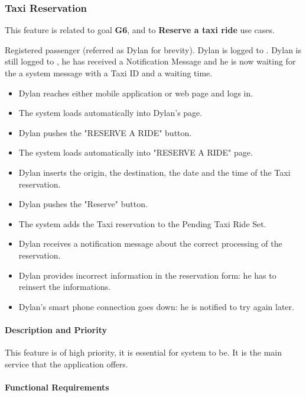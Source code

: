 \subsubsection{Taxi Reservation}
This feature is related to goal \textbf{G6}, and to \textbf{Reserve a taxi ride} use cases.
\begin{itemize}
	 Registered passenger (referred as Dylan for brevity).
	 Dylan is logged to \myTaxiService{}.
	 Dylan is still logged to \myTaxiService{}, he has received a Notification Message and he is now waiting for the a system message with a Taxi ID and a waiting time.
	\begin{itemize}
		\item Dylan reaches either \myTaxiService{} mobile application or web page and logs in.
		\item The system loads automatically into Dylan's page.
		\item Dylan pushes the "RESERVE A RIDE" button.
		\item The system loads automatically into "RESERVE A RIDE" page.
		\item Dylan inserts the origin, the destination, the date and the time of the Taxi reservation.
		\item Dylan pushes the "Reserve" button.
		\item The system adds the Taxi reservation to the Pending Taxi Ride Set.
		\item Dylan receives a notification message about the correct processing of the reservation. 
	\end{itemize}
	\begin{itemize}
		\item Dylan provides incorrect information in the reservation form: he has to reinsert the informations.
		\item Dylan's smart phone connection goes down: he is notified to try again later.  
	\end{itemize}
\end{itemize}
\paragraph{Description and Priority}
This feature is of high priority, it is essential for \myTaxiService{} system to be. It is the main service that the application offers.
\paragraph{Functional Requirements}
\begin{itemize}
\end{itemize}
